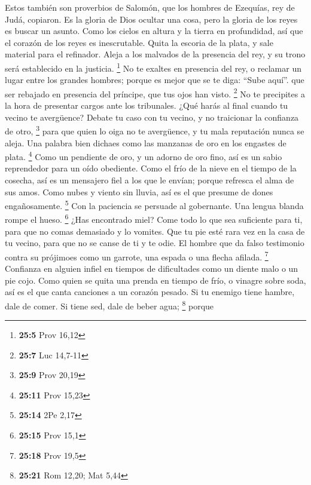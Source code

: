 \begin{paracol}{2}
 Estos también son proverbios de Salomón, que los hombres
de Ezequías, rey de Judá, copiaron.  Es la gloria de Dios
ocultar una cosa, pero la gloria de los reyes es buscar un asunto.
 Como los cielos en altura y la tierra en profundidad, así
que el corazón de los reyes es inescrutable.  Quita la
escoria de la plata, y sale material para el refinador. 
Aleja a los malvados de la presencia del rey, y su trono será
establecido en la justicia. \footnote{\textbf{25:5} Prov 16,12}
 No te exaltes en presencia del rey, o reclamar un lugar
entre los grandes hombres;  porque es mejor que se te
diga: ``Sube aquí''. que ser rebajado en presencia del príncipe, que tus
ojos han visto. \footnote{\textbf{25:7} Luc 14,7-11}  No
te precipites a la hora de presentar cargos ante los tribunales. ¿Qué
harás al final cuando tu vecino te avergüence?  Debate tu
caso con tu vecino, y no traicionar la confianza de otro, \footnote{\textbf{25:9}
  Prov 20,19}  para que quien lo oiga no te avergüence, y
tu mala reputación nunca se aleja.  Una palabra bien
dichaes como las manzanas de oro en los engastes de plata. \footnote{\textbf{25:11}
  Prov 15,23}  Como un pendiente de oro, y un adorno de
oro fino, así es un sabio reprendedor para un oído obediente.
 Como el frío de la nieve en el tiempo de la cosecha, así
es un mensajero fiel a los que le envían; porque refresca el alma de sus
amos.  Como nubes y viento sin lluvia, así es el que
presume de dones engañosamente. \footnote{\textbf{25:14} 2Pe 2,17}
 Con la paciencia se persuade al gobernante. Una lengua
blanda rompe el hueso. \footnote{\textbf{25:15} Prov 15,1}
 ¿Has encontrado miel? Come todo lo que sea suficiente
para ti, para que no comas demasiado y lo vomites.  Que
tu pie esté rara vez en la casa de tu vecino, para que no se canse de ti
y te odie.  El hombre que da falso testimonio contra su
prójimoes como un garrote, una espada o una flecha afilada. \footnote{\textbf{25:18}
  Prov 19,5}  Confianza en alguien infiel en tiempos de
dificultades como un diente malo o un pie cojo.  Como
quien se quita una prenda en tiempo de frío, o vinagre sobre soda, así
es el que canta canciones a un corazón pesado.  Si tu
enemigo tiene hambre, dale de comer. Si tiene sed, dale de beber agua;
\footnote{\textbf{25:21} Rom 12,20; Mat 5,44}  porque

\end{paracol}
